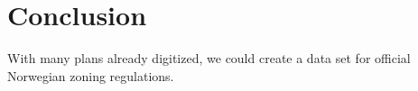 \chapter{Conclusion}
With many plans already digitized, we could create a data set for official Norwegian zoning regulations.